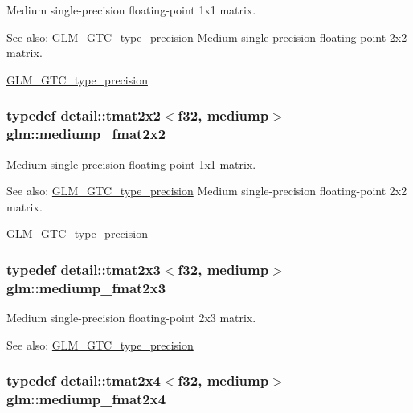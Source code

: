 Medium single-precision floating-point 1x1 matrix. \begin{Desc}
\item[See also:]\hyperlink{group__gtc__type__precision}{GLM\_\-GTC\_\-type\_\-precision} Medium single-precision floating-point 2x2 matrix. 

\hyperlink{group__gtc__type__precision}{GLM\_\-GTC\_\-type\_\-precision} \end{Desc}
\hypertarget{group__gtc__type__precision_ge9af1d96efbaeeb5c5edd9c7b0a24fa5}{
\subsubsection[mediump\_\-fmat2x2]{\setlength{\rightskip}{0pt plus 5cm}typedef detail::tmat2x2$<$f32, mediump$>$ {\bf glm::mediump\_\-fmat2x2}}}
\label{group__gtc__type__precision_ge9af1d96efbaeeb5c5edd9c7b0a24fa5}


Medium single-precision floating-point 1x1 matrix. \begin{Desc}
\item[See also:]\hyperlink{group__gtc__type__precision}{GLM\_\-GTC\_\-type\_\-precision} Medium single-precision floating-point 2x2 matrix. 

\hyperlink{group__gtc__type__precision}{GLM\_\-GTC\_\-type\_\-precision} \end{Desc}
\hypertarget{group__gtc__type__precision_gae7081e19f495e7cdbf727e1550b95a8}{
\subsubsection[mediump\_\-fmat2x3]{\setlength{\rightskip}{0pt plus 5cm}typedef detail::tmat2x3$<$f32, mediump$>$ {\bf glm::mediump\_\-fmat2x3}}}
\label{group__gtc__type__precision_gae7081e19f495e7cdbf727e1550b95a8}


Medium single-precision floating-point 2x3 matrix. \begin{Desc}
\item[See also:]\hyperlink{group__gtc__type__precision}{GLM\_\-GTC\_\-type\_\-precision} \end{Desc}
\hypertarget{group__gtc__type__precision_g8f793d90a5a6bea23c13ad195fcb5de2}{
\subsubsection[mediump\_\-fmat2x4]{\setlength{\rightskip}{0pt plus 5cm}typedef detail::tmat2x4$<$f32, mediump$>$ {\bf glm::mediump\_\-fmat2x4}}}
\label{group__gtc__type__precision_g8f793d90a5a6bea23c13ad195fcb5de2}


